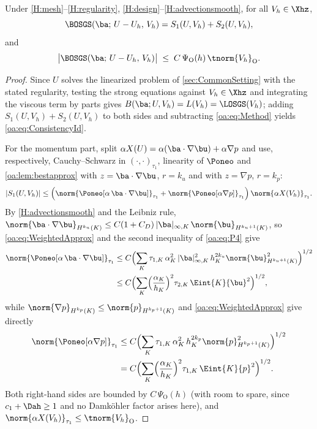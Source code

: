 \begin{lemma}
\label{oa:lem:consistency}
Under \cref{H:mesh}--\cref{H:regularity}, \cref{H:design}--\cref{H:advectionsmooth}, for all $V_h \in \Xhz$,
\begin{equation}
  \label{oa:eq:ConsistencyId}
  \BOSGS(\ba;\, U - U_h,\, V_h)
  = S_1(U, V_h) + S_2(U, V_h),
\end{equation}
and
\begin{equation}
  \label{oa:eq:ConsistencyBound}
  \bigl| \BOSGS(\ba;\, U - U_h,\, V_h) \bigr|
  \;\le\; C\,\Psi_{\mathrm O}(h)\,\tnorm{V_h}_{\mathrm{O}}.
\end{equation}
\end{lemma}

\begin{proof}
Since $U$ solves the linearized problem of \cref{sec:CommonSetting} with the stated regularity, testing the
strong equations against $V_h \in \Xhz$ and integrating the viscous term by parts
gives $B(\ba; U, V_h) = L(V_h) = \LOSGS(V_h)$; adding $S_1(U,V_h) + S_2(U,V_h)$ to both sides and
subtracting \cref{oa:eq:Method} yields \cref{oa:eq:ConsistencyId}.

For the momentum part, split $\alpha X(U) = \alpha(\ba\cdot\nabla\bu) + \alpha\nabla p$
and use, respectively, Cauchy--Schwarz in $(\cdot,\cdot)_{\tau_1}$, linearity of
$\Poneo$ and \cref{oa:lem:bestapprox} with $z = \ba\cdot\nabla\bu$, $r = k_u$ and with
$z = \nabla p$, $r = k_p$:
\[
  |S_1(U, V_h)|
  \le \Bigl( \norm{\Poneo[\alpha\,\ba\cdot\nabla\bu]}_{\tau_1}
  + \norm{\Poneo[\alpha\nabla p]}_{\tau_1} \Bigr)\,\norm{\alpha X(V_h)}_{\tau_1}.
\]
By \cref{H:advectionsmooth} and the Leibniz rule,
$\norm{\ba\cdot\nabla\bu}_{H^{k_u}(K)} \le C(1+C_D)\,|\ba|_{\infty,K}\,
\norm{\bu}_{H^{k_u+1}(K)}$, so \cref{oa:eq:WeightedApprox} and the second inequality of
\cref{oa:eq:P4} give
\[
\begin{aligned}
  \norm{\Poneo[\alpha\,\ba\cdot\nabla\bu]}_{\tau_1}
  &\le C \Bigl( \sum_K \tau_{1,K}\,\alpha_K^2\,|\ba|_{\infty,K}^2\, h_K^{2k_u}
  \norm{\bu}_{H^{k_u+1}(K)}^2 \Bigr)^{1/2} \\
  &\le C \Bigl( \sum_K \Bigl(\frac{\alpha_K}{h_K}\Bigr)^{2} \tau_{2,K}\,
  \Eint{K}{\bu}^2 \Bigr)^{1/2},
\end{aligned}
\]
while $\norm{\nabla p}_{H^{k_p}(K)} \le \norm{p}_{H^{k_p+1}(K)}$ and
\cref{oa:eq:WeightedApprox} give directly
\[
\begin{aligned}
  \norm{\Poneo[\alpha\nabla p]}_{\tau_1}
  &\le C \Bigl( \sum_K \tau_{1,K}\,\alpha_K^2\, h_K^{2k_p}
  \norm{p}_{H^{k_p+1}(K)}^2 \Bigr)^{1/2} \\
  &= C \Bigl( \sum_K \Bigl(\frac{\alpha_K}{h_K}\Bigr)^{2} \tau_{1,K}\,
  \Eint{K}{p}^2 \Bigr)^{1/2}.
\end{aligned}
\]
Both right-hand sides are bounded by $C\,\Psi_{\mathrm O}(h)$ (with room to spare, since
$c_1+\Dah \ge 1$ and no Damk\"ohler factor arises here), and
$\norm{\alpha X(V_h)}_{\tau_1} \le \tnorm{V_h}_{\mathrm{O}}$.


\end{proof}

